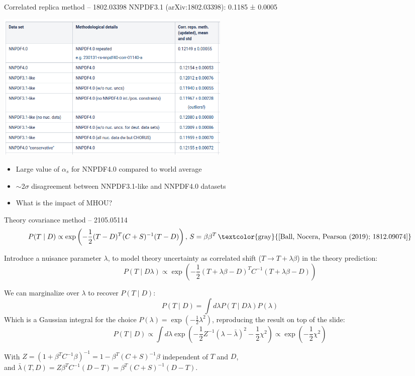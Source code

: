 \documentclass[aspectratio=169, 8pt,t]{beamer}
\begin{document}
\begin{frame}{Correlated replica method -- 1802.03398}
  NNPDF3.1 (arXiv:1802.03398): 0.1185 ± 0.0005

  \includegraphics[width=0.5\textwidth]{figures/alphasresultstablecut.png}

  \begin{itemize}
    \item Large value of $\alpha_s$ for NNPDF4.0 compared to world average
    \item $\sim$2$\sigma$ disagreement between NNPDF3.1-like and NNPDF4.0 datasets
    \item What is the impact of MHOU?
  \end{itemize}
\end{frame}


\begin{frame}{Theory covariance method -- 2105.05114}
  $$
    P(T \mid D) \propto \exp \left(-\frac{1}{2}(T-D)^T(C+S)^{-1}(T-D)\right), \, S=\beta\beta^T \, \text{\textcolor{gray}{[Ball, Nocera, Pearson (2019); 1812.09074]}}
  $$

  Introduce a nuisance parameter $\lambda$, to model theory uncertainty as correlated shift ($T\rightarrow T+\lambda\beta$) in the theory prediction:
  $$
    P(T \mid D \lambda) \propto \exp \left(-\frac{1}{2}(T+\lambda \beta-D)^T C^{-1}(T+\lambda \beta-D)\right)
  $$

  We can marginalize over $\lambda$ to recover $P(T\mid D)$:
  $$ 
    P(T \mid D)=\int d \lambda P(T \mid D \lambda) P(\lambda)
  $$
  Which is a Gaussian integral for the choice $P(\lambda)=\exp\left(-\frac{1}{2}\lambda^2\right)$, reproducing the result on top of the slide:
  $$
    P(T \mid D) \propto \int d \lambda \exp \left(-\frac{1}{2} Z^{-1}(\lambda-\bar{\lambda})^2-\frac{1}{2} \chi^2\right) \propto \exp \left(-\frac{1}{2} \chi^2\right)
  $$

  With $Z=\left(1+\beta^T C^{-1} \beta\right)^{-1}=1-\beta^T(C+S)^{-1} \beta$ independent of $T$ and $D$, \\ and $\bar{\lambda}(T, D)=Z \beta^T C^{-1}(D-T)=\beta^T(C+S)^{-1}(D-T)$. 

\end{frame}
\end{document}
